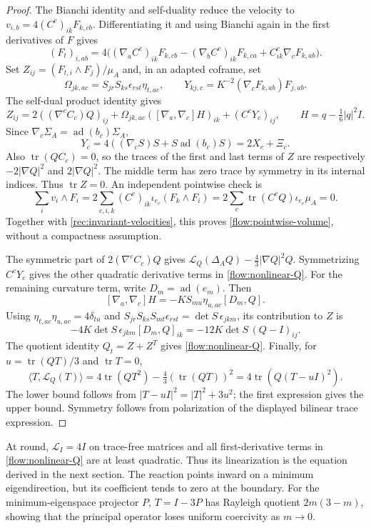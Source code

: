 \documentclass[11pt]{article}
\numberwithin{equation}{section}
\theoremstyle{definition}
\theoremstyle{remark}
\begin{document}
\begin{proof}
The Bianchi identity and self-duality reduce the velocity to
$v_{i,b}=4(C^c)_{ik}F_{k,cb}$. Differentiating it and using Bianchi again
in the first derivatives of $F$ gives
\[
 (F_t)_{i,ab}=4\bigl((\nabla_a C^c)_{ik}F_{k,cb}
 -(\nabla_b C^c)_{ik}F_{k,ca}+C^c_{ik}\nabla_cF_{k,ab}\bigr).
\]
Set $Z_{ij}=(F_{t,i}\wedge F_j)/\mu_A$ and, in an adapted coframe, set
\[
 \Omega_{jk,ac}=S_{jr}S_{ks}\epsilon_{rst}\eta_{t,ac},
 \qquad Y_{kj,c}=K^{-2}(\nabla_cF_{k,ab})F_{j,ab}.
\]
The self-dual product identity gives
\[
 Z_{ij}=2((\nabla^c C_c)Q)_{ij}
   +\Omega_{jk,ac}([\nabla_a,\nabla_c]H)_{ik}
   +(C^cY_c)_{ij},\qquad H=q-\tfrac16|q|^2I.
\]
Since $\nabla_c\Sigma_A=\operatorname{ad}(b_c)\Sigma_A$,
\[
 Y_c=4((\nabla_cS)S+S\operatorname{ad}(b_c)S)=2X_c+\Xi_c.
\]
Also $\operatorname{tr}(QC_c)=0$, so the traces of the first and
last terms of $Z$ are respectively $-2|\nabla Q|^2$ and
$2|\nabla Q|^2$. The middle term has zero trace by symmetry in
its internal indices. Thus $\operatorname{tr}Z=0$.
An independent pointwise check is
\[
 \sum_i v_i\wedge F_i
 =2\sum_{c,i,k}(C^c)_{ik}\iota_{e_c}(F_k\wedge F_i)
 =2\sum_c\operatorname{tr}(C^cQ)\iota_{e_c}\mu_A=0.
\]
Together with \eqref{rec:invariant-velocities}, this proves
\eqref{flow:pointwise-volume}, without a compactness assumption.

The symmetric part of $2(\nabla^cC_c)Q$ gives
$\mathscr L_Q(\Delta_AQ)-\tfrac43|\nabla Q|^2Q$.
Symmetrizing $C^cY_c$ gives the other quadratic derivative terms
in \eqref{flow:nonlinear-Q}. For the remaining curvature term,
write $D_m=\operatorname{ad}(e_m)$. Then
\[
 [\nabla_a,\nabla_c]H=-KS_{mu}\eta_{u,ac}[D_m,Q].
\]
Using $\eta_{t,ac}\eta_{u,ac}=4\delta_{tu}$ and
$S_{jr}S_{ks}S_{mt}\epsilon_{rst}=\det S\,\epsilon_{jkm}$,
its contribution to $Z$ is
\[
 -4K\det S\,\epsilon_{jkm}[D_m,Q]_{ik}
 =-12K\det S\,(Q-I)_{ij}.
\]
The quotient identity $Q_t=Z+Z^T$ gives \eqref{flow:nonlinear-Q}.
Finally, for $u=\operatorname{tr}(QT)/3$ and $\operatorname{tr}T=0$,
\[
 \langle T,\mathscr L_Q(T)\rangle
 =4\operatorname{tr}(QT^2)-\tfrac43(\operatorname{tr}(QT))^2
 =4\operatorname{tr}(Q(T-uI)^2).
\]
The lower bound follows from $|T-uI|^2=|T|^2+3u^2$;
the first expression gives the upper bound. Symmetry follows from
polarization of the displayed bilinear trace expression.
\end{proof}

At round, $\mathscr L_I=4I$ on trace-free matrices and all first-derivative
terms in \eqref{flow:nonlinear-Q} are at least quadratic. Thus its
linearization is the equation derived in the next section. The reaction
points inward on a minimum eigendirection, but its coefficient tends to
zero at the boundary. For the minimum-eigenspace projector $P$,
$T=I-3P$ has Rayleigh quotient $2m(3-m)$, showing that the principal
operator loses uniform coercivity as $m\to0$.
\end{document}
